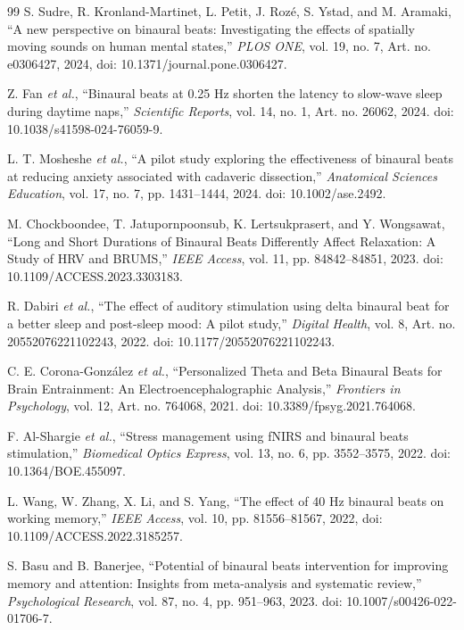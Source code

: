 \documentclass[12pt, a4paper]{report}
\begin{document}
\begin{thebibliography}{99}
S. Sudre, R. Kronland-Martinet, L. Petit, J. Roz\'e, S. Ystad, and M. Aramaki, ``A new perspective on binaural beats: Investigating the effects of spatially moving sounds on human mental states,'' \textit{PLOS ONE}, vol. 19, no. 7, Art. no. e0306427, 2024, doi: 10.1371/journal.pone.0306427.

Z. Fan \textit{et al.}, ``Binaural beats at 0.25 Hz shorten the latency to slow-wave sleep during daytime naps,'' \textit{Scientific Reports}, vol. 14, no. 1, Art. no. 26062, 2024. doi: 10.1038/s41598-024-76059-9.

L. T. Mosheshe \textit{et al.}, ``A pilot study exploring the effectiveness of binaural beats at reducing anxiety associated with cadaveric dissection,'' \textit{Anatomical Sciences Education}, vol. 17, no. 7, pp. 1431--1444, 2024. doi: 10.1002/ase.2492.

M. Chockboondee, T. Jatupornpoonsub, K. Lertsukprasert, and Y. Wongsawat, ``Long and Short Durations of Binaural Beats Differently Affect Relaxation: A Study of HRV and BRUMS,'' \textit{IEEE Access}, vol. 11, pp. 84842--84851, 2023. doi: 10.1109/ACCESS.2023.3303183.

R. Dabiri \textit{et al.}, ``The effect of auditory stimulation using delta binaural beat for a better sleep and post-sleep mood: A pilot study,'' \textit{Digital Health}, vol. 8, Art. no. 20552076221102243, 2022. doi: 10.1177/20552076221102243.

C. E. Corona-Gonz\'alez \textit{et al.}, ``Personalized Theta and Beta Binaural Beats for Brain Entrainment: An Electroencephalographic Analysis,'' \textit{Frontiers in Psychology}, vol. 12, Art. no. 764068, 2021. doi: 10.3389/fpsyg.2021.764068.


F. Al-Shargie \textit{et al.}, ``Stress management using fNIRS and binaural beats stimulation,'' \textit{Biomedical Optics Express}, vol. 13, no. 6, pp. 3552--3575, 2022. doi: 10.1364/BOE.455097.

L. Wang, W. Zhang, X. Li, and S. Yang, ``The effect of 40 Hz binaural beats on working memory,'' \textit{IEEE Access}, vol. 10, pp. 81556--81567, 2022, doi: 10.1109/ACCESS.2022.3185257.
    
S. Basu and B. Banerjee, ``Potential of binaural beats intervention for improving memory and attention: Insights from meta-analysis and systematic review,'' \textit{Psychological Research}, vol. 87, no. 4, pp. 951--963, 2023. doi: 10.1007/s00426-022-01706-7.


\end{thebibliography}
\end{document}
